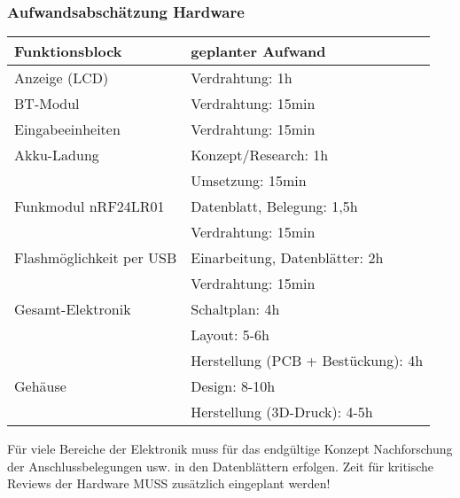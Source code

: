 \subsubsection{Aufwandsabschätzung Hardware}
\begin{tabular}{l|l}
	Funktionsblock & geplanter Aufwand\\
	\hline
	Anzeige (LCD) & Verdrahtung: 1h \\
	\hline
	BT-Modul & Verdrahtung: 15min \\
	\hline
	Eingabeeinheiten & Verdrahtung: 15min \\
	\hline
	Akku-Ladung & Konzept/Research: 1h\\
	& Umsetzung: 15min \\
	\hline
	Funkmodul nRF24LR01 & Datenblatt, Belegung: 1,5h \\
	& Verdrahtung: 15min \\
	\hline
	Flashmöglichkeit per USB & Einarbeitung, Datenblätter: 2h\\
	& Verdrahtung: 15min\\
	\hline
	Gesamt-Elektronik & Schaltplan: 4h\\
	& Layout: 5-6h \\
	& Herstellung (PCB + Bestückung): 4h\\
	\hline
	Gehäuse & Design: 8-10h\\
	& Herstellung (3D-Druck): 4-5h\\
\end{tabular}

Für viele Bereiche der Elektronik muss für das endgültige Konzept Nachforschung der Anschlussbelegungen usw. in den Datenblättern erfolgen. Zeit für kritische Reviews der Hardware MUSS zusätzlich eingeplant werden!

